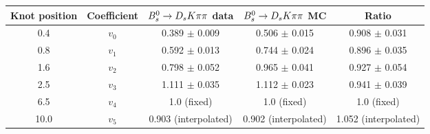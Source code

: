 \begin{tabular}{c c c c c}
\hline
\hline
Knot position & Coefficient & ${{B}^0_{s}}\rightarrow{\ensuremath{{D}_{s}}}{\ensuremath{K}}{\ensuremath{\pi}}{\ensuremath{\pi}}$ data & ${{B}^0_{s}}\rightarrow{\ensuremath{{D}_{s}}}{\ensuremath{K}}{\ensuremath{\pi}}{\ensuremath{\pi}}$ MC & Ratio \\
\hline
0.4 & $v_{0}$ & 0.389 $\pm$ 0.009 & 0.506 $\pm$ 0.015 & 0.908 $\pm$ 0.031\\
0.8 & $v_{1}$ & 0.592 $\pm$ 0.013 & 0.744 $\pm$ 0.024 & 0.896 $\pm$ 0.035\\
1.6 & $v_{2}$ & 0.798 $\pm$ 0.052 & 0.965 $\pm$ 0.041 & 0.927 $\pm$ 0.054\\
2.5 & $v_{3}$ & 1.111 $\pm$ 0.035 & 1.112 $\pm$ 0.023 & 0.941 $\pm$ 0.039\\
6.5 & $v_{4}$ &  1.0 (fixed) & 1.0 (fixed) & 1.0 (fixed)\\
10.0 & $v_{5}$ & 0.903 (interpolated) & 0.902 (interpolated) & 1.052 (interpolated) \\
\hline
\hline
\end{tabular}

